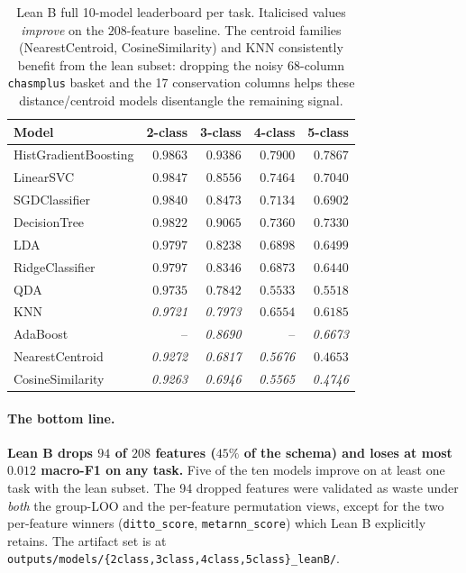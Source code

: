 \documentclass[11pt,a4paper]{article}
\begin{document}
\begin{table}[H]
\centering
\caption{Lean B full 10-model leaderboard per task. Italicised values
\emph{improve} on the $208$-feature baseline. The centroid families
(NearestCentroid, CosineSimilarity) and KNN consistently benefit from
the lean subset: dropping the noisy 68-column \texttt{chasmplus} basket
and the 17 conservation columns helps these distance/centroid models
disentangle the remaining signal.}
\label{tab:lean-full}
\small
\begin{tabular}{lrrrr}
\toprule
Model & 2-class & 3-class & 4-class & 5-class \\
\midrule
HistGradientBoosting & $\mathbf{0.9863}$ & $\mathbf{0.9386}$ & $\mathbf{0.7900}$ & $\mathbf{0.7867}$ \\
LinearSVC            & $0.9847$ & $0.8556$ & $0.7464$ & $0.7040$ \\
SGDClassifier        & $0.9840$ & $0.8473$ & $0.7134$ & $0.6902$ \\
DecisionTree         & $0.9822$ & $0.9065$ & $0.7360$ & $0.7330$ \\
LDA                  & $0.9797$ & $0.8238$ & $0.6898$ & $0.6499$ \\
RidgeClassifier      & $0.9797$ & $0.8346$ & $0.6873$ & $0.6440$ \\
QDA                  & $0.9735$ & $0.7842$ & $0.5533$ & $0.5518$ \\
KNN                  & \emph{0.9721} & \emph{0.7973} & $0.6554$ & $0.6185$ \\
AdaBoost             & --       & \emph{0.8690} & --       & \emph{0.6673} \\
NearestCentroid      & \emph{0.9272} & \emph{0.6817} & \emph{0.5676} & $0.4653$ \\
CosineSimilarity     & \emph{0.9263} & \emph{0.6946} & \emph{0.5565} & \emph{0.4746} \\
\bottomrule
\end{tabular}
\end{table}

\paragraph{The bottom line.}
\textbf{Lean B drops $94$ of $208$ features ($45\%$ of the schema) and
loses at most $0.012$ macro-F1 on any task.} Five of the ten models
improve on at least one task with the lean subset. The 94 dropped
features were validated as waste under \emph{both} the group-LOO and the
per-feature permutation views, except for the two per-feature winners
(\texttt{ditto\_score}, \texttt{metarnn\_score}) which Lean B
explicitly retains. The artifact set is at
\texttt{outputs/models/\{2class,3class,4class,5class\}\_leanB/}.
\end{document}
